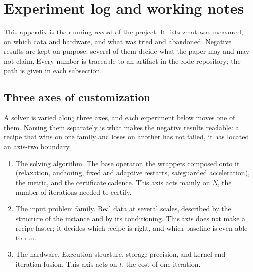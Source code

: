 \section{Experiment log and working notes}
\label{app:log}

This appendix is the running record of the project. It lists what was
measured, on which data and hardware, and what was tried and abandoned.
Negative results are kept on purpose: several of them decide what the paper
may and may not claim. Every number is traceable to an artifact in the code
repository; the path is given in each subsection.

\subsection{Three axes of customization}
\label{app:log:axes}

A solver is varied along three axes, and each experiment below moves one of
them. Naming them separately is what makes the negative results readable: a
recipe that wins on one family and loses on another has not failed, it has
located an axis-two boundary.

\begin{enumerate}
\item The solving algorithm. The base operator, the wrappers composed onto it
  (relaxation, anchoring, fixed and adaptive restarts, safeguarded
  acceleration), the metric, and the certificate cadence. This axis acts
  mainly on $N$, the number of iterations needed to certify.
\item The input problem family. Real data at several scales, described by the
  structure of the instance and by its conditioning. This axis does not make a
  recipe faster; it decides which recipe is right, and which baseline is even
  able to run.
\item The hardware. Execution structure, storage precision, and kernel and
  iteration fusion. This axis acts on $t$, the cost of one iteration.
\end{enumerate}

